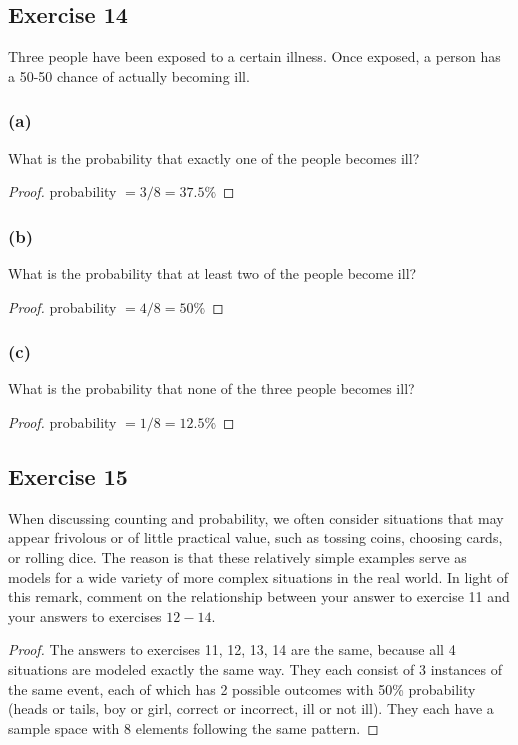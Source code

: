 \documentclass[14pt]{extarticle}
\begin{document}
\subsection{Exercise 14}
Three people have been exposed to a certain illness. Once exposed, a person has a 50-50 chance of actually becoming ill.

\subsubsection{(a)}
What is the probability that exactly one of the people becomes ill?

\begin{proof}
probability \(= 3/8 = 37.5\%\)
\end{proof}

\subsubsection{(b)}
What is the probability that at least two of the people become ill?

\begin{proof}
probability \(= 4/8 = 50\%\)
\end{proof}

\subsubsection{(c)}
What is the probability that none of the three people becomes ill?

\begin{proof}
probability \(= 1/8 = 12.5\%\)
\end{proof}

\subsection{Exercise 15}
When discussing counting and probability, we often consider situations that may appear frivolous or of little practical 
value, such as tossing coins, choosing cards, or rolling dice. The reason is that these relatively simple examples 
serve as models for a wide variety of more complex situations in the real world. In light of this remark, 
comment on the relationship between your answer to exercise 11 and your answers to exercises $12-14$.

\begin{proof}
The answers to exercises 11, 12, 13, 14 are the same, because all 4 situations are modeled exactly the same way.
They each consist of 3 instances of the same event, each of which has 2 possible outcomes with 50\% probability (heads 
or tails, boy or girl, correct or incorrect, ill or not ill). They each have a sample space with 8 elements 
following the same pattern.
\end{proof}
\end{document}

